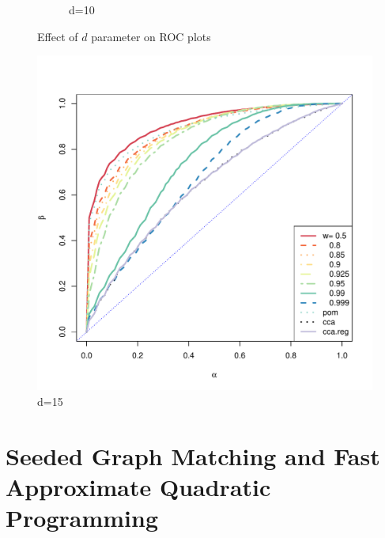 \documentclass[12pt,oneside,final]{thesis}\usepackage[]{graphicx}\usepackage[]{color}
\begin{document}
\begin{figure}
\begin{subfigure}[b]{0.47\textwidth}
                \caption{d=10}
                \label{fig:ROC-d-10}
        \end{subfigure}
         
        \caption{Effect of $d$ parameter on ROC plots}\label{fig:ROC-d}
        \label{fig:ROC-d}

\end{figure}

\begin{center}
\begin{figure}

                \centering
               \includegraphics[scale=0.75]{ROC-d-15.pdf}
                \caption{d=15}
                \label{fig:ROC-d-15}
       
\end{figure}
\end{center}










\chapter{Seeded Graph Matching and Fast Approximate Quadratic Programming}
\label{sec:sgm-faq}
\end{document}
